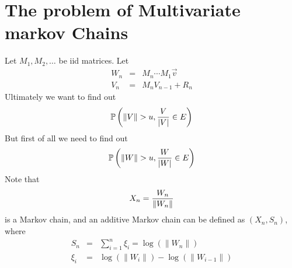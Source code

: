 \documentclass[12pt]{article}
\begin{document}
\section{The problem of Multivariate markov Chains}
Let $M_1, M_2, \dots$ be iid matrices. Let
\begin{eqnarray*}
  W_n &=& M_n \cdots M_1 \vec v  \\
  V_n &=& M_n V_{n-1} + R_n
\end{eqnarray*}
Ultimately we want to find out
\[
\P\left(
  \| V \| > u, {V \over |V|}  \in E
\right)
\]
But first of all we need to find out
\[
\P\left(
  \| W \| > u, {W \over |W|} \in E
\right)
\]
Note that
\[
X_n = {W_n \over \|W_n\|}
\]
is a Markov chain, and an additive Markov chain can be defined as
$(X_n, S_n)$, where
\begin{eqnarray*}
  S_n &=& \sum_{i=1}^n \xi_i = \log(\|W_n\|) \\
  \xi_i &=& \log(\|W_i\|) - \log(\|W_{i-1}\|)
  \end{eqnarray*}
\end{document}

